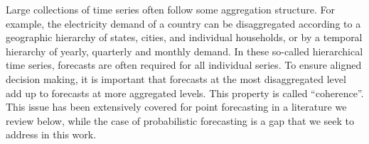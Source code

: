 \documentclass[a4paper, 11pt]{article}
\theoremstyle{definition}
\begin{document}

Large collections of time series often follow some aggregation structure. For example, the electricity demand of a country can be disaggregated according to a geographic hierarchy of states, cities, and individual households, or by a temporal hierarchy of yearly, quarterly and monthly demand. In these so-called hierarchical time series, forecasts are often required for all individual series. To ensure aligned decision making, it is important that forecasts at the most disaggregated level add up to forecasts at more aggregated levels. This property is called ``coherence''. This issue has been extensively covered for point forecasting in a literature we review below, while the case of probabilistic forecasting is a gap that we seek to address in this work.
\end{document}
